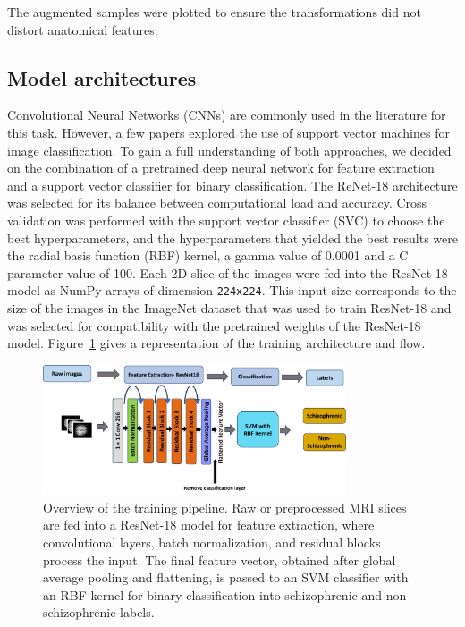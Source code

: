 \begin{itemize}
\end{itemize}

The augmented samples were plotted to ensure the transformations did not distort anatomical features.

%
\subsection{Model architectures}

Convolutional Neural Networks (CNNs) are commonly used in the literature for this task. However, a few papers explored the use of support vector machines for image classification. To gain a full understanding of both approaches, we decided on the combination of a pretrained deep neural network for feature extraction and a support vector classifier for binary classification. The ReNet-18 architecture was selected for its balance between computational load and accuracy. Cross validation was performed with the support vector classifier (SVC) to choose the best hyperparameters, and the hyperparameters that yielded the best results were the radial basis function (RBF) kernel, a gamma value of 0.0001 and a C parameter value of 100. Each 2D slice of the images were fed into the ResNet-18 model as NumPy arrays of dimension \texttt{224x224}. This input size corresponds to the size of the images in the ImageNet dataset that was used to train ResNet-18 and was selected for compatibility with the pretrained weights of the ResNet-18 model. Figure~\ref{fig:model_architecture} gives a representation of the training architecture and flow.
%
\begin{figure}
    \centering
    \includegraphics[width=0.8\textwidth]{./figs/model_architecture.png} %
    \caption{Overview of the training pipeline. Raw or preprocessed MRI slices are fed into a ResNet-18 model for feature extraction, where convolutional layers, batch normalization, and residual blocks process the input. The final feature vector, obtained after global average pooling and flattening, is passed to an SVM classifier with an RBF kernel for binary classification into schizophrenic and non-schizophrenic labels.}\label{fig:model_architecture}
\end{figure}

